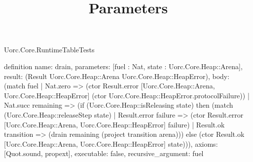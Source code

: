 \begin{lexlean}{Uorc.Core.RuntimeTableTests}
\title{Parameters}
\begin{semanticmodule}
definition{
  name: drain,
  parameters: [fuel : Nat, state : Uorc.Core.Heap::Arena],
  result: (Result Uorc.Core.Heap::Arena Uorc.Core.Heap::HeapError),
  body: (match fuel
    | Nat.zero => (ctor Result.error [Uorc.Core.Heap::Arena, Uorc.Core.Heap::HeapError] (ctor Uorc.Core.Heap::HeapError.protocolFailure))
    | Nat.succ remaining => (if (Uorc.Core.Heap::isReleasing state) then (match (Uorc.Core.Heap::releaseStep state)
      | Result.error failure => (ctor Result.error [Uorc.Core.Heap::Arena, Uorc.Core.Heap::HeapError] failure)
      | Result.ok transition => (drain remaining (project transition arena))) else (ctor Result.ok [Uorc.Core.Heap::Arena, Uorc.Core.Heap::HeapError] state))),
  axioms: [Quot.sound, propext],
  executable: false,
  recursive_argument: fuel
}


\end{semanticmodule}
\end{lexlean}
